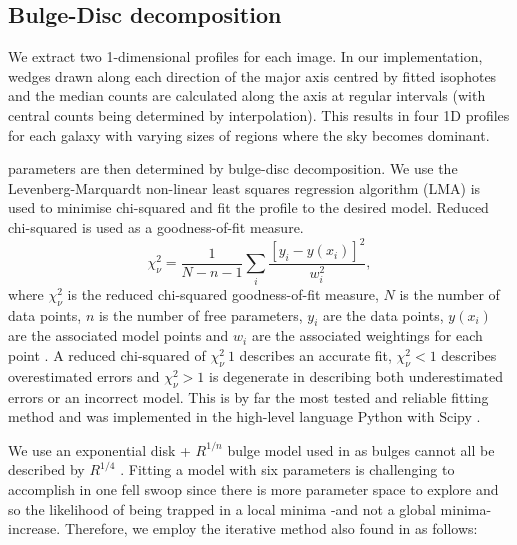 \subsection{Bulge-Disc decomposition}
We extract two 1-dimensional profiles for each image. In our implementation, wedges drawn along each direction of the major axis centred by fitted isophotes and the median counts are calculated along the axis at regular intervals (with central counts being determined by interpolation). This results in four 1D profiles for each galaxy with varying sizes of regions where the sky becomes dominant. 

\sersic parameters are then determined by bulge-disc decomposition. We use the Levenberg-Marquardt non-linear least squares regression algorithm (LMA) is used to minimise chi-squared and fit the profile to the desired model. Reduced chi-squared is used as a goodness-of-fit measure.
\begin{equation}
	\chi^{2}_{\nu} = \frac{1}{N-n-1} \sum_{i} \frac{[y_i - y(x_i)]^2}{w_i^2},
\end{equation}
where $\chi_{\nu}^2$ is the reduced chi-squared goodness-of-fit measure, $N$ is the number of data points, $n$ is the number of free parameters, $y_i$ are the data points, $y(x_i)$ are the associated model points and $w_i$ are the associated weightings for each point \citep{marquardt_algorithm_1963}. A reduced chi-squared of $\chi_{\nu}^2~1$ describes an accurate fit, $\chi_{\nu}^2<1$ describes overestimated errors and $\chi_{\nu}^2>1$ is degenerate in describing both underestimated errors or an incorrect model. This is by far the most tested and reliable fitting method \citep{lawson_solving_1995} and was implemented in the high-level language Python with Scipy \citep{oliphant_python_2007}. 

We use an exponential disk + \sersic $R^{1/n}$ bulge model used in \citet{allen_millennium_2006} as bulges cannot all be described by $R^{1/4}$ \citep{simard_catalog_2011}. Fitting a model with six parameters is challenging to accomplish in one fell swoop since there is more parameter space to explore and so the likelihood of being trapped in a local minima -and not a global minima- increase. Therefore, we employ the iterative method also found in \citet{weinzirl_bulge_2009} as follows:

